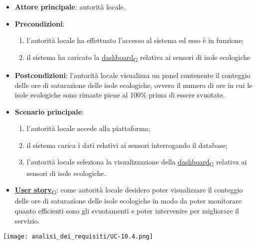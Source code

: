 \newpage

\begin{itemize}
	\item \textbf{Attore principale}: autorità locale.
	\item \textbf{Precondizioni}:
	      \begin{enumerate}
		      \item l'autorità locale ha effettuato l'accesso al sistema ed esso è in funzione;
		      \item il sistema ha caricato la \href{https://7last.github.io/docs/rtb/documentazione-interna/glossario\#dashboard}{dashboard\textsubscript{G}} relativa ai sensori di isole ecologiche
	      \end{enumerate}
	\item \textbf{Postcondizioni}: l'autorità locale visualizza un panel contenente il conteggio delle ore di saturazione delle isole ecologiche,
	      ovvero il numero di ore in cui le isole ecologiche sono rimaste piene al 100\% prima di essere svuotate.
	\item \textbf{Scenario principale}:
	      \begin{enumerate}
		      \item l'autorità locale accede alla piattaforma;
		      \item il sistema carica i dati relativi ai sensori interrogando il database;
		      \item l'autorità locale seleziona la visualizzazione della \href{https://7last.github.io/docs/rtb/documentazione-interna/glossario\#dashboard}{dashboard\textsubscript{G}} relativa ai sensori di isole ecologiche.
	      \end{enumerate}
	\item \href{https://7last.github.io/docs/rtb/documentazione-interna/glossario\#user-story}{\textbf{User story}\textsubscript{G}}:
	      come autorità locale desidero poter visualizzare il conteggio delle ore di saturazione delle isole ecologiche in modo da poter monitorare
	      quanto efficienti sono gli svuotamenti e poter intervenire per migliorare il servizio.
\end{itemize}
\begin{center}
	\texttt{[image: analisi\_dei\_requisiti/UC-10.4.png]}
\end{center}

